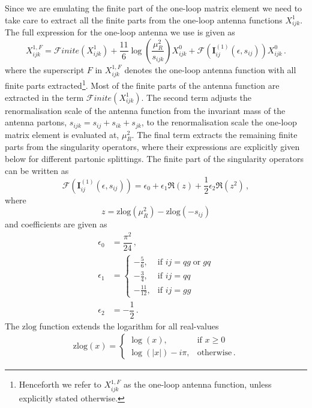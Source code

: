 \documentclass[main.tex]{subfiles}
\begin{document}
Since we are emulating the finite part of the one-loop matrix
element we need to take care to extract all the finite parts
from the one-loop antenna functions $X_{ijk}^{1}$. The
full expression for the one-loop antenna we use is given as
\begin{equation}
    X_{ijk}^{1, F}  = \mathcal{F}inite(X_{ijk}^{1}) + \dfrac{11}{6}\log\left(\dfrac{\mu_{R}^{2}}{s_{ijk}} \right) X_{ijk}^{0} + \mathcal{F}(\mathbf{I}_{ij}^{(1)}(\epsilon, s_{ij})) X_{ijk}^{0} \, .
    \label{eq:finite_X31}
\end{equation}
where the superscript $F$ in $X_{ijk}^{1,F}$ denotes the
one-loop antenna function with all finite parts extracted\footnote{Henceforth we refer to $X_{ijk}^{1,F}$ as the
one-loop antenna function, unless explicitly stated otherwise.}.
Most of the finite parts of the antenna function are extracted in the term
$\mathcal{F}inite(X_{ijk}^{1})$. The second term
adjusts the renormalisation scale of the antenna function from
the invariant mass of the antenna partons, $s_{ijk} = s_{ij} + s_{ik} + s_{jk}$,
to the renormalisation scale the one-loop matrix element is
evaluated at, $\mu_{R}^{2}$. The final term extracts the
remaining finite parts from the singularity operators,
where their expressions are explicitly given below for
different partonic splittings.
The finite part of the singularity operators can be written as
\begin{equation}
    \mathcal{F}(\mathbf{I}^{(1)}_{ij}(\epsilon, s_{ij})) = \epsilon_{0} + \epsilon_{1} \Re{(z)} + \dfrac{1}{2}\epsilon_{2} \Re{(z^{2})} \, ,
\end{equation}
where
\begin{equation}
    z = \mathrm{zlog}(\mu_{R}^{2}) - \mathrm{zlog}(-s_{ij})
\end{equation}
and coefficients are given as
\begin{align}
    \epsilon_{0} &= \dfrac{\pi^{2}}{24} \, , \nonumber \\
    \epsilon_{1} &=
    \begin{cases}
        -\frac{5}{6}, & \text{if } ij = qg \; \text{or} \; gq \\
        -\frac{3}{4}, & \text{if } ij = qq \\
        -\frac{11}{12}, & \text{if } ij = gg 
    \end{cases} \\
    \epsilon_{2} &= -\dfrac{1}{2} \, . \nonumber
\end{align}
The $\mathrm{zlog}$ function extends the logarithm for all real-values
\begin{align}
    \mathrm{zlog}(x) = 
    \begin{cases}
        \log(x), & \text{if } x \geq 0 \\
        \log(|x|) - i \pi , & \text{otherwise} \, .
    \end{cases}
\end{align}
\end{document}
